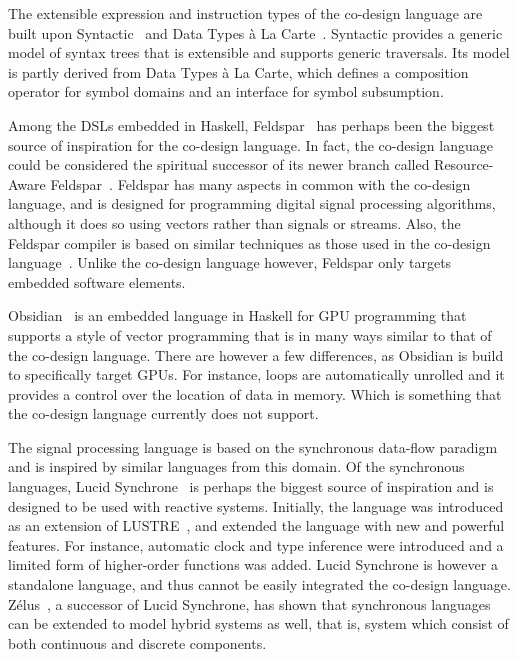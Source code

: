\documentclass[../paper.tex]{subfiles}
\begin{document}
The extensible expression and instruction types of the co-design language are built upon Syntactic~\cite{axelsson2012} and Data Types \`{a} La Carte~\cite{DTC}. Syntactic provides a generic model of syntax trees that is extensible and supports generic traversals. Its model is partly derived from Data Types \`{a} La Carte, which defines a composition operator for symbol domains and an interface for symbol subsumption.

Among the DSLs embedded in Haskell, Feldspar~\cite{axelsson2010, axelsson2010-2} has perhaps been the biggest source of inspiration for the co-design language. In fact, the co-design language could be considered the spiritual successor of its newer branch called Resource-Aware Feldspar~\cite{raw-feldspar}. Feldspar has many aspects in common with the co-design language, and is designed for programming digital signal processing algorithms, although it does so using vectors rather than signals or streams. Also, the Feldspar compiler is based on similar techniques as those used in the co-design language~\cite{axelsson2016, axelsson2015}. Unlike the co-design language however, Feldspar only targets embedded software elements.

Obsidian~\cite{svensson2008} is an embedded language in Haskell for GPU programming that supports a style of vector programming that is in many ways similar to that of the co-design language. There are however a few differences, as Obsidian is build to specifically target GPUs. For instance, loops are automatically unrolled and it provides a control over the location of data in memory. Which is something that the co-design language currently does not support.

The signal processing language is based on the synchronous data-flow paradigm and is inspired by similar languages from this domain. Of the synchronous languages, Lucid Synchrone~\cite{pouzet2006, colaco2004} is perhaps the biggest source of inspiration and is designed to be used with reactive systems. Initially, the language was introduced as an extension of LUSTRE~\cite{hu1998}, and extended the language with new and powerful features. For instance, automatic clock and type inference were introduced and a limited form of higher-order functions was added. Lucid Synchrone is however a standalone language, and thus cannot be easily integrated the co-design language. Z{\'e}lus~\cite{zelus2013}, a successor of Lucid Synchrone, has shown that synchronous languages can be extended to model hybrid systems as well, that is, system which consist of both continuous and discrete components.
\end{document}
